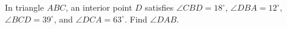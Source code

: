 In triangle $ABC$, an interior point $D$ satisfies $\angle CBD=18^\circ$, $\angle DBA=12^\circ$, $\angle BCD=39^\circ$, and $\angle DCA=63^\circ$. Find $\angle DAB$.
